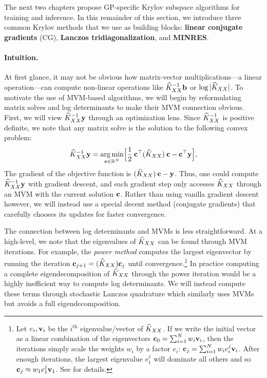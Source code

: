 The next two chapters propose GP-specific Krylov subspace algorithms for training and inference.
In this remainder of this section, we introduce three common Krylov methods that we use as building blocks: {\bf linear conjugate gradients} (CG), {\bf Lanczos tridiagonalization}, and {\bf MINRES}.

\paragraph{Intuition.}
At first glance, it may not be obvious how matrix-vector multiplications---a linear operation---can compute non-linear operations like $\widehat{K}_{XX}^{-1} \mathbf{b}$ or $\log \vert \widehat{K}_{XX} \vert$.
To motivate the use of MVM-based algorithms, we will begin by reformulating matrix solves and log determinants to make their MVM connection obvious.
First, we will view $\widehat{K}_{XX}^{-1} \mathbf{y}$ through an optimization lens.
Since $\widehat{K}_{XX}^{-1}$ is positive definite, we note that any matrix solve is the solution to the following convex problem:
%
\begin{equation}
  \widehat{K}_{XX}^{-1} \mathbf{y} = \operatorname*{arg\,min}_{\mathbf{c} \in \mathbb{R}^{N}} \Bigl[ \frac{1}{2} \: \mathbf{c}^\top (\widehat{K}_{XX}) \: \mathbf{c} - \mathbf{c}^\top \mathbf{y} \Bigr],
  \label{eqn:solve_as_optim}
\end{equation}
%
The gradient of the objective function is $(\widehat{K}_{XX}) \: \mathbf{c} - \mathbf{y}$.
Thus, one could compute $\widehat{K}_{XX}^{-1} \mathbf{y}$ with gradient descent, and each gradient step only accesses $\widehat{K}_{XX}$ through an MVM with the current solution $\mathbf{c}$.
Rather than using vanilla gradient descent however, we will instead use a special decent method (conjugate gradients) that carefully chooses its updates for faster convergence.

The connection between log determinants and MVMs is less straightforward.
At a high-level, we note that the eigenvalues of $\widehat{K}_{XX}$ can be found through MVM iterations.
For example, the \emph{power method} computes the largest eigenvector by running the iteration $\mathbf{c}_{j+1} = (\widehat{K}_{XX}) \mathbf{c}_{j}$ until convergence.\footnote{
  Let $e_i, \mathbf{v}_i$ be the $i^\text{th}$ eigenvalue/vector of $\widehat{K}_{XX}$.
  If we write the initial vector as a linear combination of the eigenvectors $\mathbf{c}_{0} = \sum_{i=1}^N w_i \mathbf{v}_i$, then the iterations simply scale the weights $w_i$ by a factor $e_i$:
  $\mathbf{c}_{j} = \sum_{i=1}^N w_i e_i^j \mathbf{v}_i$.
  After enough iterations, the largest eigenvalue $e_1^j$ will dominate all others and so $\mathbf{c}_j \approx w_1 e_1^j \mathbf{v}_1$.
  See \citep[e.g.][Ch. 8]{golub2012matrix} for details.
}
In practice computing a complete eigendecomposition of $\widehat{K}_{XX}$ through the power iteration would be a highly inefficient way to compute log determinants.
We will instead compute these terms through stochastic Lanczos quadrature \citep{ubaru2017fast} which similarly uses MVMs but avoids a full eigendecomposition.

